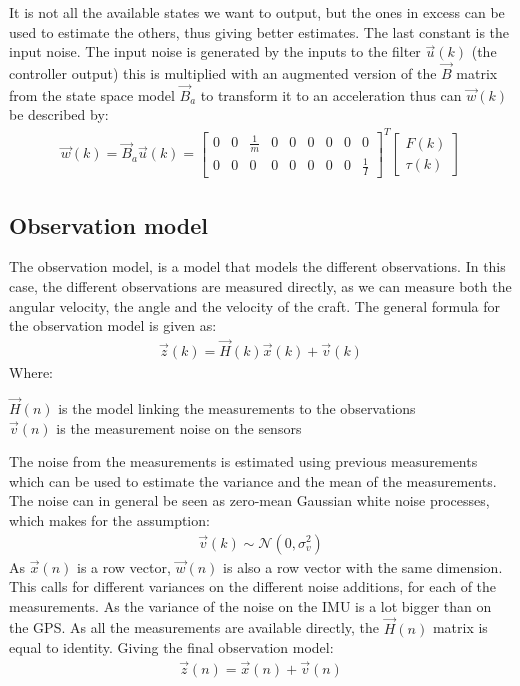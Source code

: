 It is not all the available states we want to output, but the ones in excess can be used to estimate the others, thus giving better estimates. The last constant is the input noise. The input noise is generated by the inputs to the filter $\vec{u}(k)$ (the controller output) this is multiplied with an augmented version of the $\vec{B}$ matrix from the state space model $\vec{B}_a$ to transform it to an acceleration thus can $\vec{w}(k)$ be described by:
\begin{align}
\vec{w}(k) = \vec{B}_a\vec{u}(k) = \begin{bmatrix}
0 & 0 & \frac{1}{m} & 0 & 0 & 0 & 0 & 0 & 0\\
0 & 0 & 0 & 0 & 0 & 0 & 0 & 0 & \frac{1}{I}
\end{bmatrix}^T\begin{bmatrix}
F(k)\\
\tau(k)
\end{bmatrix}
\end{align}

\subsection{Observation model}
The observation model, is a model that models the different observations. In this case, the different observations are measured directly, as we can measure both the angular velocity, the angle and the velocity of the craft. The general formula for the observation model is given as:
\begin{align}
\vec{z}(k) = \vec{H}(k)\vec{x}(k) + \vec{v}(k)
\end{align}
\noindent Where:
\begin{ffk}
$\vec{H}(n)$ is the model linking the measurements to the observations\\
$\vec{v}(n)$ is the measurement noise on the sensors
\end{ffk}
The noise from the measurements is estimated using previous measurements which can be used to estimate the variance and the mean of the measurements. The noise can in general be seen as zero-mean Gaussian white noise processes, which makes for the assumption:
\begin{align}
\vec{v}(k) \sim \mathcal{N}(0,\sigma_v^2)
\end{align}
As $\vec{x}(n)$ is a row vector, $\vec{w}(n)$ is also a row vector with the same dimension. This calls for different variances on the different noise additions, for each of the measurements. As the variance of the noise on the \ac{IMU} is a lot bigger than on the \ac{GPS}. As all the measurements are available directly, the $\vec{H}(n)$ matrix is equal to identity. Giving the final observation model:
\begin{align}
\vec{z}(n) = \vec{x}(n) + \vec{v}(n)
\end{align}

